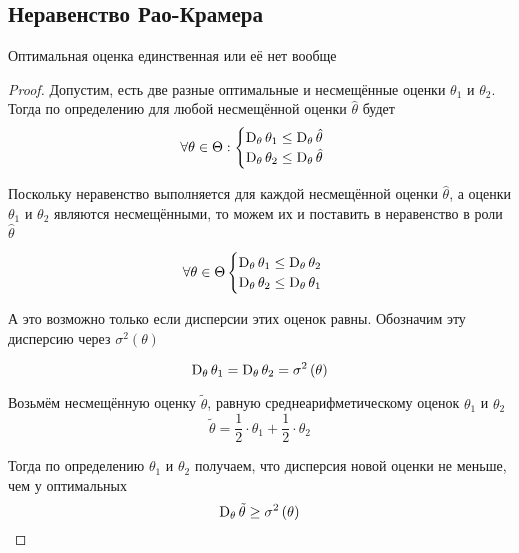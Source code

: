 \subsection{Неравенство Рао-Крамера}
\begin{theorem}
  \label{theorem:Kolmogorov}
  Оптимальная оценка единственная или её нет вообще
\end{theorem}
\begin{proof}
  Допустим,
  есть две разные оптимальные и несмещённые оценки $\theta_1$ и $\theta_2$.
  Тогда по определению для любой несмещённой оценки $\hat{\theta}$ будет
  \begin{align*}
    \forall\theta\in\Theta:
    \begin{cases}
      \operatorname{D}_{\theta} \theta_1
        \le\operatorname{D}_{\theta} \hat{\theta}\\
      \operatorname{D}_{\theta} \theta_2
        \le\operatorname{D}_{\theta} \hat{\theta}
    \end{cases}
  \end{align*}

  Поскольку неравенство выполняется
  для каждой несмещённой оценки $\hat{\theta}$,
  а оценки $\theta_1$ и $\theta_2$ являются несмещёнными,
  то можем их и поставить в неравенство в роли $\hat{\theta}$

  \begin{align*}
    \forall\theta\in\Theta
    \begin{cases}
      \operatorname{D}_{\theta} \theta_1
        \le\operatorname{D}_{\theta} \theta_2\\
      \operatorname{D}_{\theta} \theta_2
        \le\operatorname{D}_{\theta} \theta_1
    \end{cases}
  \end{align*}

  А это возможно только если дисперсии этих оценок равны.
  Обозначим эту дисперсию через $\sigma^2\left(\theta\right)$

  $$\operatorname{D}_{\theta} \theta_1
    =\operatorname{D}_{\theta} \theta_2
    =\sigma^2\left(\theta\right)$$

  Возьмём несмещённую оценку $\tilde{\theta}$,
  равную среднеарифметическому оценок $\theta_1$ и $\theta_2$
  $$\tilde{\theta}=\frac{1}{2}\cdot\theta_1+\frac{1}{2}\cdot\theta_2$$

  Тогда по определению $\theta_1$ и $\theta_2$ получаем,
  что дисперсия новой оценки не меньше, чем у оптимальных
  \begin{equation}\label{eq:estimator_ge}
    \operatorname{D}_{\theta} \tilde{\theta}\ge\sigma^2\left(\theta\right)
  \end{equation}


\end{proof}
